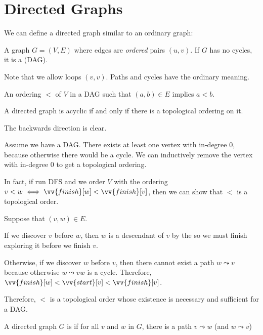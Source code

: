 \section{Directed Graphs}

We can define a directed graph similar to an ordinary graph:

\begin{defn}
  A graph $G = (V, E)$ where edges are \emph{ordered} pairs $(u, v)$.
  If $G$ has no cycles, it is a  (DAG).
\end{defn}

Note that we allow loops $(v, v)$.
Paths and cycles have the ordinary meaning.

\begin{defn}
  An ordering $<$ of $V$ in a DAG such that $(a,b) \in E$ implies $a < b$.
\end{defn}

\begin{prop}
  A directed graph is acyclic if and only if there is a topological ordering on it.
\end{prop}
\begin{prf}
  The backwards direction is clear.

  Assume we have a DAG.
  There exists at least one vertex with in-degree 0,
  because otherwise there would be a cycle.
  We can inductively remove the vertex with in-degree 0 to get a topological ordering.

  In fact, if run DFS and we order $V$ with the ordering
  $v < w \iff \vv{finish}[w] < \vv{finish}[v]$,
  then we can show that $<$ is a topological order.

  Suppose that $(v, w) \in E$.
  
  If we discover $v$ before $w$, then $w$ is a descendant of $v$
  by the  so we must finish exploring it before we finish $v$.

  Otherwise, if we discover $w$ before $v$,
  then there cannot exist a path $w \leadsto v$
  because otherwise $w \leadsto vw$ is a cycle.
  Therefore, $\vv{finish}[w] < \vv{start}[v] < \vv{finish}[v]$.

  Therefore, $<$ is a topological order whose existence
  is necessary and sufficient for a DAG.
\end{prf}

\begin{defn*}
  A directed graph $G$ is  if for all $v$ and $w$ in $G$,
  there is a path $v \leadsto w$ (and $w \leadsto v$)
\end{defn*}

